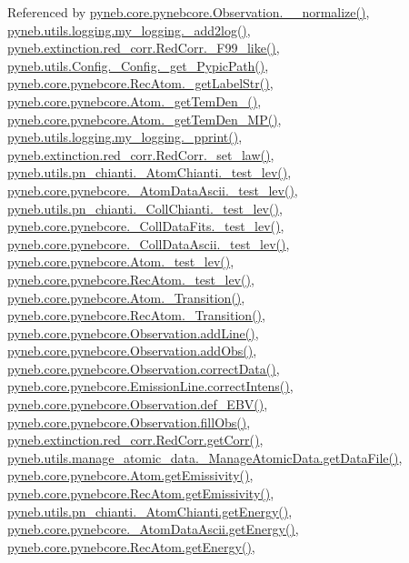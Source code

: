 Referenced by \hyperlink{pynebcore_8py_source_l03885}{pyneb.\+core.\+pynebcore.\+Observation.\+\_\+\+\_\+normalize()}, \hyperlink{logging_8py_source_l00059}{pyneb.\+utils.\+logging.\+my\+\_\+logging.\+\_\+add2log()}, \hyperlink{red__corr_8py_source_l00658}{pyneb.\+extinction.\+red\+\_\+corr.\+Red\+Corr.\+\_\+\+F99\+\_\+like()}, \hyperlink{_config_8py_source_l00086}{pyneb.\+utils.\+Config.\+\_\+\+Config.\+\_\+get\+\_\+\+Pypic\+Path()}, \hyperlink{pynebcore_8py_source_l02854}{pyneb.\+core.\+pynebcore.\+Rec\+Atom.\+\_\+get\+Label\+Str()}, \hyperlink{pynebcore_8py_source_l01803}{pyneb.\+core.\+pynebcore.\+Atom.\+\_\+get\+Tem\+Den\+\_()}, \hyperlink{pynebcore_8py_source_l01980}{pyneb.\+core.\+pynebcore.\+Atom.\+\_\+get\+Tem\+Den\+\_\+\+M\+P()}, \hyperlink{logging_8py_source_l00051}{pyneb.\+utils.\+logging.\+my\+\_\+logging.\+\_\+pprint()}, \hyperlink{red__corr_8py_source_l00176}{pyneb.\+extinction.\+red\+\_\+corr.\+Red\+Corr.\+\_\+set\+\_\+law()}, \hyperlink{pn__chianti_8py_source_l00284}{pyneb.\+utils.\+pn\+\_\+chianti.\+\_\+\+Atom\+Chianti.\+\_\+test\+\_\+lev()}, \hyperlink{pynebcore_8py_source_l00435}{pyneb.\+core.\+pynebcore.\+\_\+\+Atom\+Data\+Ascii.\+\_\+test\+\_\+lev()}, \hyperlink{pn__chianti_8py_source_l00449}{pyneb.\+utils.\+pn\+\_\+chianti.\+\_\+\+Coll\+Chianti.\+\_\+test\+\_\+lev()}, \hyperlink{pynebcore_8py_source_l00660}{pyneb.\+core.\+pynebcore.\+\_\+\+Coll\+Data\+Fits.\+\_\+test\+\_\+lev()}, \hyperlink{pynebcore_8py_source_l01026}{pyneb.\+core.\+pynebcore.\+\_\+\+Coll\+Data\+Ascii.\+\_\+test\+\_\+lev()}, \hyperlink{pynebcore_8py_source_l01459}{pyneb.\+core.\+pynebcore.\+Atom.\+\_\+test\+\_\+lev()}, \hyperlink{pynebcore_8py_source_l02596}{pyneb.\+core.\+pynebcore.\+Rec\+Atom.\+\_\+test\+\_\+lev()}, \hyperlink{pynebcore_8py_source_l01367}{pyneb.\+core.\+pynebcore.\+Atom.\+\_\+\+Transition()}, \hyperlink{pynebcore_8py_source_l02696}{pyneb.\+core.\+pynebcore.\+Rec\+Atom.\+\_\+\+Transition()}, \hyperlink{pynebcore_8py_source_l03436}{pyneb.\+core.\+pynebcore.\+Observation.\+add\+Line()}, \hyperlink{pynebcore_8py_source_l03467}{pyneb.\+core.\+pynebcore.\+Observation.\+add\+Obs()}, \hyperlink{pynebcore_8py_source_l03906}{pyneb.\+core.\+pynebcore.\+Observation.\+correct\+Data()}, \hyperlink{pynebcore_8py_source_l03325}{pyneb.\+core.\+pynebcore.\+Emission\+Line.\+correct\+Intens()}, \hyperlink{pynebcore_8py_source_l03861}{pyneb.\+core.\+pynebcore.\+Observation.\+def\+\_\+\+E\+B\+V()}, \hyperlink{pynebcore_8py_source_l03452}{pyneb.\+core.\+pynebcore.\+Observation.\+fill\+Obs()}, \hyperlink{red__corr_8py_source_l00211}{pyneb.\+extinction.\+red\+\_\+corr.\+Red\+Corr.\+get\+Corr()}, \hyperlink{manage__atomic__data_8py_source_l00297}{pyneb.\+utils.\+manage\+\_\+atomic\+\_\+data.\+\_\+\+Manage\+Atomic\+Data.\+get\+Data\+File()}, \hyperlink{pynebcore_8py_source_l01716}{pyneb.\+core.\+pynebcore.\+Atom.\+get\+Emissivity()}, \hyperlink{pynebcore_8py_source_l02873}{pyneb.\+core.\+pynebcore.\+Rec\+Atom.\+get\+Emissivity()}, \hyperlink{pn__chianti_8py_source_l00346}{pyneb.\+utils.\+pn\+\_\+chianti.\+\_\+\+Atom\+Chianti.\+get\+Energy()}, \hyperlink{pynebcore_8py_source_l00525}{pyneb.\+core.\+pynebcore.\+\_\+\+Atom\+Data\+Ascii.\+get\+Energy()}, \hyperlink{pynebcore_8py_source_l02811}{pyneb.\+core.\+pynebcore.\+Rec\+Atom.\+get\+Energy()}, 